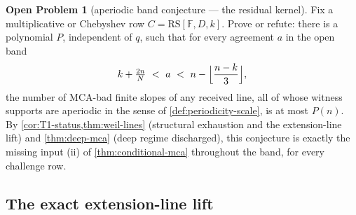 \documentclass[11pt]{article}
\theoremstyle{definition}
\newtheorem{problem}[theorem]{Open Problem}
\theoremstyle{remark}
\newcommand{\F}{\mathbb{F}}
\newcommand{\RS}{\mathrm{RS}}
\begin{document}
\begin{problem}[aperiodic band conjecture --- the residual kernel]\label{prob:band}
Fix a multiplicative or Chebyshev row $C=\RS[\F,D,k]$. Prove or refute: there is a polynomial $P$, independent of $q$, such that for every agreement $a$ in the open band
\[
k+\tfrac{2n}N\ <\ a\ <\ n-\Bigl\lfloor\frac{n-k}3\Bigr\rfloor ,
\]
the number of MCA-bad finite slopes of any received line, all of whose witness supports are aperiodic in the sense of \cref{def:periodicity-scale}, is at most $P(n)$. By \cref{cor:T1-status,thm:weil-lines} \textup(structural exhaustion and the extension-line lift\textup) and \cref{thm:deep-mca} \textup(deep regime discharged\textup), this conjecture is exactly the missing input \textup{(ii)} of \cref{thm:conditional-mca} throughout the band, for every challenge row.
\end{problem}

\subsection{The exact extension-line lift}\label{sec:discharge-T3}
\end{document}
